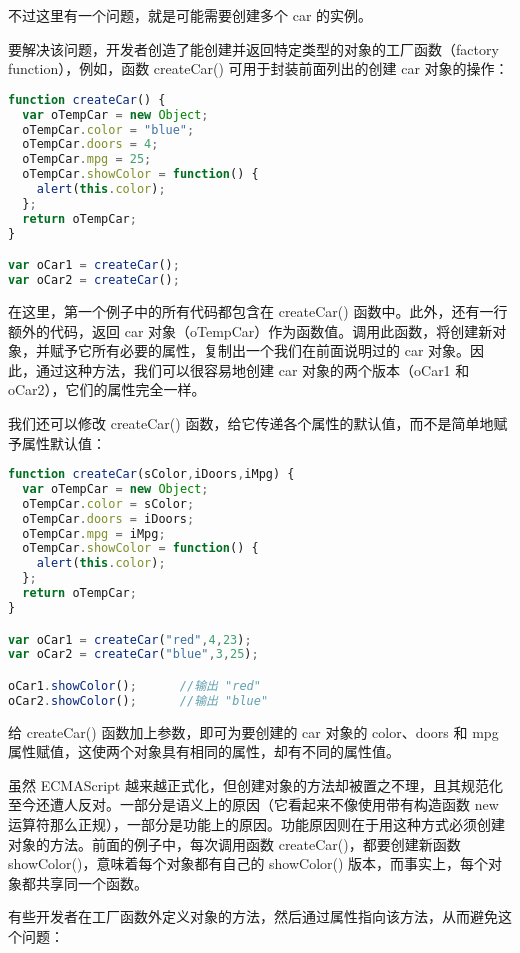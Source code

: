 不过这里有一个问题，就是可能需要创建多个 car 的实例。

要解决该问题，开发者创造了能创建并返回特定类型的对象的工厂函数（factory function），例如，函数 createCar() 可用于封装前面列出的创建 car 对象的操作：

\begin{lstlisting}[language=JavaScript]
function createCar() {
  var oTempCar = new Object;
  oTempCar.color = "blue";
  oTempCar.doors = 4;
  oTempCar.mpg = 25;
  oTempCar.showColor = function() {
    alert(this.color);
  };
  return oTempCar;
}

var oCar1 = createCar();
var oCar2 = createCar();
\end{lstlisting}

在这里，第一个例子中的所有代码都包含在 createCar() 函数中。此外，还有一行额外的代码，返回 car 对象（oTempCar）作为函数值。调用此函数，将创建新对象，并赋予它所有必要的属性，复制出一个我们在前面说明过的 car 对象。因此，通过这种方法，我们可以很容易地创建 car 对象的两个版本（oCar1 和 oCar2），它们的属性完全一样。


我们还可以修改 createCar() 函数，给它传递各个属性的默认值，而不是简单地赋予属性默认值：



\begin{lstlisting}[language=JavaScript]
function createCar(sColor,iDoors,iMpg) {
  var oTempCar = new Object;
  oTempCar.color = sColor;
  oTempCar.doors = iDoors;
  oTempCar.mpg = iMpg;
  oTempCar.showColor = function() {
    alert(this.color);
  };
  return oTempCar;
}

var oCar1 = createCar("red",4,23);
var oCar2 = createCar("blue",3,25);

oCar1.showColor();		//输出 "red"
oCar2.showColor();		//输出 "blue"
\end{lstlisting}


给 createCar() 函数加上参数，即可为要创建的 car 对象的 color、doors 和 mpg 属性赋值，这使两个对象具有相同的属性，却有不同的属性值。


虽然 ECMAScript 越来越正式化，但创建对象的方法却被置之不理，且其规范化至今还遭人反对。一部分是语义上的原因（它看起来不像使用带有构造函数 new 运算符那么正规），一部分是功能上的原因。功能原因则在于用这种方式必须创建对象的方法。前面的例子中，每次调用函数 createCar()，都要创建新函数 showColor()，意味着每个对象都有自己的 showColor() 版本，而事实上，每个对象都共享同一个函数。

有些开发者在工厂函数外定义对象的方法，然后通过属性指向该方法，从而避免这个问题：


